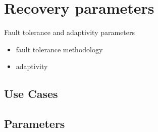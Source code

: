 
\section{Recovery parameters} \label{s:recovery}

Fault tolerance and adaptivity parameters

\begin{itemize}
\item fault tolerance methodology
\item adaptivity
\end{itemize}

\subsection{Use Cases}
\subsection{Parameters}
